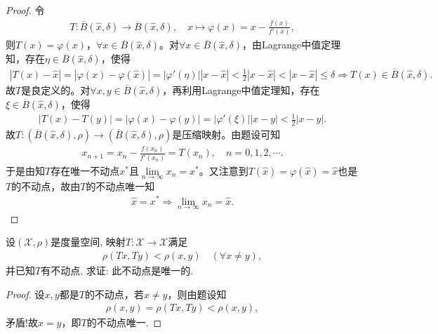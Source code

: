 \documentclass[../../main.tex]{subfiles}%
\begin{document}
\begin{proof}
令
\begin{align*}
T:\overline{B}(\widehat{x},\delta)\to \overline{B}(\widehat{x},\delta),\quad x\mapsto \varphi(x)=x-\frac{f(x)}{f'(x)},
\end{align*}
则$T(x)=\varphi(x)$，$\forall x\in \overline{B}(\widehat{x},\delta)$。对$\forall x\in \overline{B}(\widehat{x},\delta)$，由Lagrange中值定理知，存在$\eta\in \overline{B}(\widehat{x},\delta)$，使得
\begin{align*}
|T(x)-\widehat{x}|=|\varphi(x)-\varphi(\widehat{x})|=|\varphi'(\eta)||x-\widehat{x}|<\frac{1}{2}|x-\widehat{x}|<|x-\widehat{x}|\leqslant \delta \Longrightarrow T(x)\in \overline{B}(\widehat{x},\delta).
\end{align*}
故$T$是良定义的。对$\forall x,y\in \overline{B}(\widehat{x},\delta)$，再利用Lagrange中值定理知，存在$\xi\in \overline{B}(\widehat{x},\delta)$，使得
\begin{align*}
|T(x)-T(y)|=|\varphi(x)-\varphi(y)|=|\varphi'(\xi)||x-y|<\frac{1}{2}|x-y|.
\end{align*}
故$T:(\overline{B}(\widehat{x},\delta),\rho)\to (\overline{B}(\widehat{x},\delta),\rho)$是压缩映射。由题设可知
\begin{align*}
x_{n+1}=x_n-\frac{f(x_n)}{f'(x_n)}=T(x_n),\quad n=0,1,2,\cdots.
\end{align*}
于是由知$T$存在唯一不动点$x^*$且$\lim\limits_{n\to\infty}x_n=x^*$。又注意到$T(\widehat{x})=\varphi(\widehat{x})=\widehat{x}$也是$T$的不动点，故由$T$的不动点唯一知
\begin{align*}
\widehat{x}=x^*\Longrightarrow \lim\limits_{n\to\infty}x_n=\widehat{x}.
\end{align*}
\end{proof}

\begin{example}
设$(\mathscr{X},\rho)$是度量空间, 映射$T:\mathscr{X}\to\mathscr{X}$满足
\begin{align*}
\rho(Tx,Ty)<\rho(x,y)\quad (\forall x\neq y),
\end{align*}
并已知$T$有不动点, 求证: 此不动点是唯一的.
\end{example}
\begin{proof}
设$x,y$都是$T$的不动点，若$x\neq y$，则由题设知
\begin{align*}
\rho(x,y)=\rho(Tx,Ty)<\rho(x,y),
\end{align*}
矛盾!故$x=y$，即$T$的不动点唯一.
\end{proof}
\end{document}
